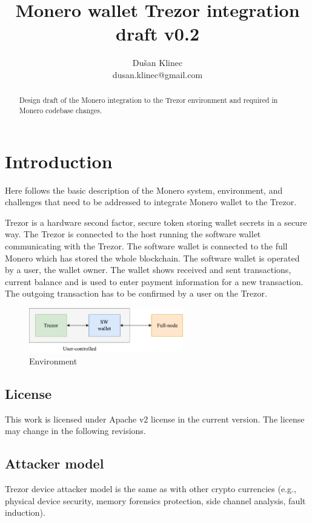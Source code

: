 \documentclass[]{article}
\title{Monero wallet Trezor integration draft v0.2}
\author{Du\v{s}an Klinec \\{dusan.klinec@gmail.com}}
\begin{document}
	
\maketitle

\begin{abstract}
	Design draft of the Monero integration to the Trezor environment and required in Monero codebase changes.
\end{abstract}

\section{Introduction}
Here follows the basic description of the Monero system, environment, and challenges that need to be addressed to integrate Monero wallet to the Trezor.

Trezor is a hardware second factor, secure token storing wallet secrets in a secure way. 
The Trezor is connected to the host running the software wallet communicating with the Trezor. The software wallet is connected to the full Monero which has stored the whole blockchain. The software wallet is operated by a user, the wallet owner. The wallet shows received and sent transactions, current balance and is used to enter payment information for a new transaction. The outgoing transaction has to be confirmed by a user on the Trezor.

\begin{figure}[h]
	\centering
	\includegraphics[width=0.6\textwidth, angle=0]{trezord.pdf}
	\caption{Environment}
\end{figure}


\subsection{License}
This work is licensed under Apache v2 license in the current version. The license may change in the following revisions.

\subsection{Attacker model}

Trezor device attacker model is the same as with other crypto currencies (e.g., physical device security, memory forensics protection, side channel analysis, fault induction).
\end{document}
